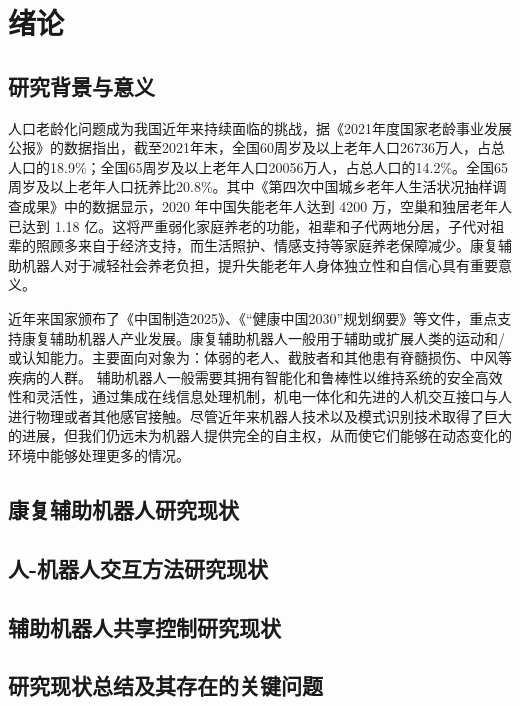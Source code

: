 
\chapter{绪论}

\section{研究背景与意义}
人口老龄化问题成为我国近年来持续面临的挑战，据《2021年度国家老龄事业发展公报》的数据指出，截至2021年末，全国60周岁及以上老年人口26736万人，占总人口的18.9\%；全国65周岁及以上老年人口20056万人，占总人口的14.2\%。全国65周岁及以上老年人口抚养比20.8\%。其中《第四次中国城乡老年人生活状况抽样调查成果》中的数据显示，2020 年中国失能老年人达到 4200 万，空巢和独居老年人已达到 1.18 亿。这将严重弱化家庭养老的功能，祖辈和子代两地分居，子代对祖辈的照顾多来自于经济支持，而生活照护、情感支持等家庭养老保障减少。康复辅助机器人对于减轻社会养老负担，提升失能老年人身体独立性和自信心具有重要意义。

近年来国家颁布了《中国制造2025》、《“健康中国2030”规划纲要》等文件，重点支持康复辅助机器人产业发展。康复辅助机器人一般用于辅助或扩展人类的运动和/或认知能力。主要面向对象为：体弱的老人、截肢者和其他患有脊髓损伤、中风等疾病的人群。 辅助机器人一般需要其拥有智能化和鲁棒性以维持系统的安全高效性和灵活性，通过集成在线信息处理机制，机电一体化和先进的人机交互接口与人进行物理或者其他感官接触。尽管近年来机器人技术以及模式识别技术取得了巨大的进展，但我们仍远未为机器人提供完全的自主权，从而使它们能够在动态变化的环境中能够处理更多的情况。



\section{康复辅助机器人研究现状}

\section{人-机器人交互方法研究现状}

\section{辅助机器人共享控制研究现状}

\section{研究现状总结及其存在的关键问题}

